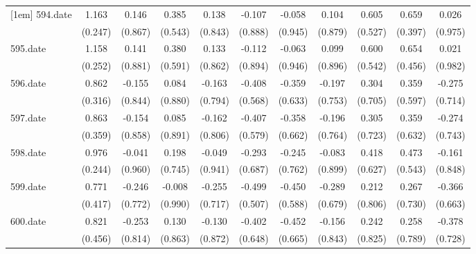 \begin{tabular}{l*{10}{c}}
[1em]
594.date    &       1.163&       0.146&       0.385&       0.138&      -0.107&      -0.058&       0.104&       0.605&       0.659&       0.026\\
            &     (0.247)&     (0.867)&     (0.543)&     (0.843)&     (0.888)&     (0.945)&     (0.879)&     (0.527)&     (0.397)&     (0.975)\\
[1em]
595.date    &       1.158&       0.141&       0.380&       0.133&      -0.112&      -0.063&       0.099&       0.600&       0.654&       0.021\\
            &     (0.252)&     (0.881)&     (0.591)&     (0.862)&     (0.894)&     (0.946)&     (0.896)&     (0.542)&     (0.456)&     (0.982)\\
[1em]
596.date    &       0.862&      -0.155&       0.084&      -0.163&      -0.408&      -0.359&      -0.197&       0.304&       0.359&      -0.275\\
            &     (0.316)&     (0.844)&     (0.880)&     (0.794)&     (0.568)&     (0.633)&     (0.753)&     (0.705)&     (0.597)&     (0.714)\\
[1em]
597.date    &       0.863&      -0.154&       0.085&      -0.162&      -0.407&      -0.358&      -0.196&       0.305&       0.359&      -0.274\\
            &     (0.359)&     (0.858)&     (0.891)&     (0.806)&     (0.579)&     (0.662)&     (0.764)&     (0.723)&     (0.632)&     (0.743)\\
[1em]
598.date    &       0.976&      -0.041&       0.198&      -0.049&      -0.293&      -0.245&      -0.083&       0.418&       0.473&      -0.161\\
            &     (0.244)&     (0.960)&     (0.745)&     (0.941)&     (0.687)&     (0.762)&     (0.899)&     (0.627)&     (0.543)&     (0.848)\\
[1em]
599.date    &       0.771&      -0.246&      -0.008&      -0.255&      -0.499&      -0.450&      -0.289&       0.212&       0.267&      -0.366\\
            &     (0.417)&     (0.772)&     (0.990)&     (0.717)&     (0.507)&     (0.588)&     (0.679)&     (0.806)&     (0.730)&     (0.663)\\
[1em]
600.date    &       0.821&      -0.253&       0.130&      -0.130&      -0.402&      -0.452&      -0.156&       0.242&       0.258&      -0.378\\
            &     (0.456)&     (0.814)&     (0.863)&     (0.872)&     (0.648)&     (0.665)&     (0.843)&     (0.825)&     (0.789)&     (0.728)\\

\end{tabular}
